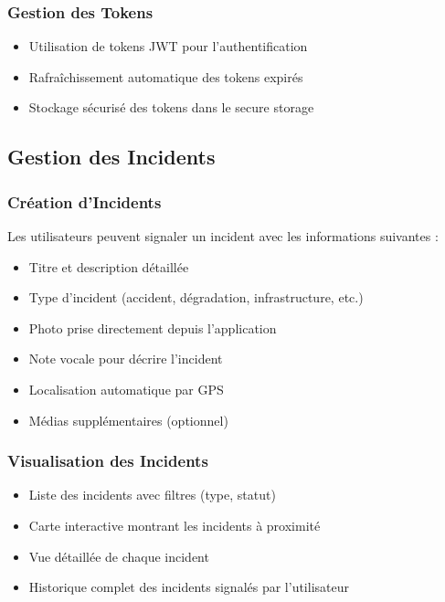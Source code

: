 \documentclass[12pt,a4paper]{article}
\begin{document}
\subsubsection{Gestion des Tokens}
\begin{itemize}
    \item Utilisation de tokens JWT pour l'authentification
    \item Rafraîchissement automatique des tokens expirés
    \item Stockage sécurisé des tokens dans le secure storage
\end{itemize}

\subsection{Gestion des Incidents}

\subsubsection{Création d'Incidents}
Les utilisateurs peuvent signaler un incident avec les informations suivantes :
\begin{itemize}
    \item Titre et description détaillée
    \item Type d'incident (accident, dégradation, infrastructure, etc.)
    \item Photo prise directement depuis l'application
    \item Note vocale pour décrire l'incident
    \item Localisation automatique par GPS
    \item Médias supplémentaires (optionnel)
\end{itemize}

\subsubsection{Visualisation des Incidents}
\begin{itemize}
    \item Liste des incidents avec filtres (type, statut)
    \item Carte interactive montrant les incidents à proximité
    \item Vue détaillée de chaque incident
    \item Historique complet des incidents signalés par l'utilisateur
\end{itemize}
\end{document}
